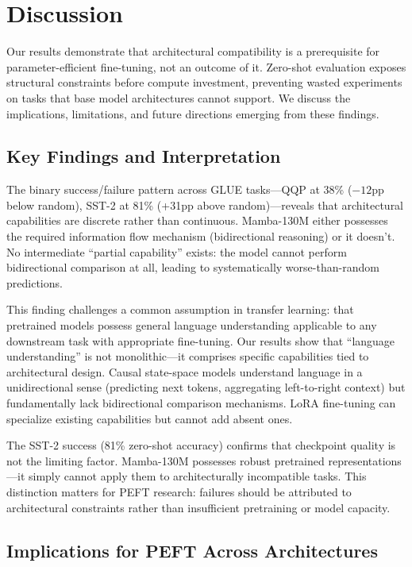 \section{Discussion}

Our results demonstrate that architectural compatibility is a prerequisite for parameter-efficient fine-tuning, not an outcome of it. Zero-shot evaluation exposes structural constraints before compute investment, preventing wasted experiments on tasks that base model architectures cannot support. We discuss the implications, limitations, and future directions emerging from these findings.

\subsection{Key Findings and Interpretation}

The binary success/failure pattern across GLUE tasks---QQP at 38\% ($-12$pp below random), SST-2 at 81\% (+31pp above random)---reveals that architectural capabilities are discrete rather than continuous. Mamba-130M either possesses the required information flow mechanism (bidirectional reasoning) or it doesn't. No intermediate ``partial capability'' exists: the model cannot perform bidirectional comparison at all, leading to systematically worse-than-random predictions.

This finding challenges a common assumption in transfer learning: that pretrained models possess general language understanding applicable to any downstream task with appropriate fine-tuning. Our results show that ``language understanding'' is not monolithic---it comprises specific capabilities tied to architectural design. Causal state-space models understand language in a unidirectional sense (predicting next tokens, aggregating left-to-right context) but fundamentally lack bidirectional comparison mechanisms. LoRA fine-tuning can specialize existing capabilities but cannot add absent ones.

The SST-2 success (81\% zero-shot accuracy) confirms that checkpoint quality is not the limiting factor. Mamba-130M possesses robust pretrained representations---it simply cannot apply them to architecturally incompatible tasks. This distinction matters for PEFT research: failures should be attributed to architectural constraints rather than insufficient pretraining or model capacity.

\subsection{Implications for PEFT Across Architectures}

